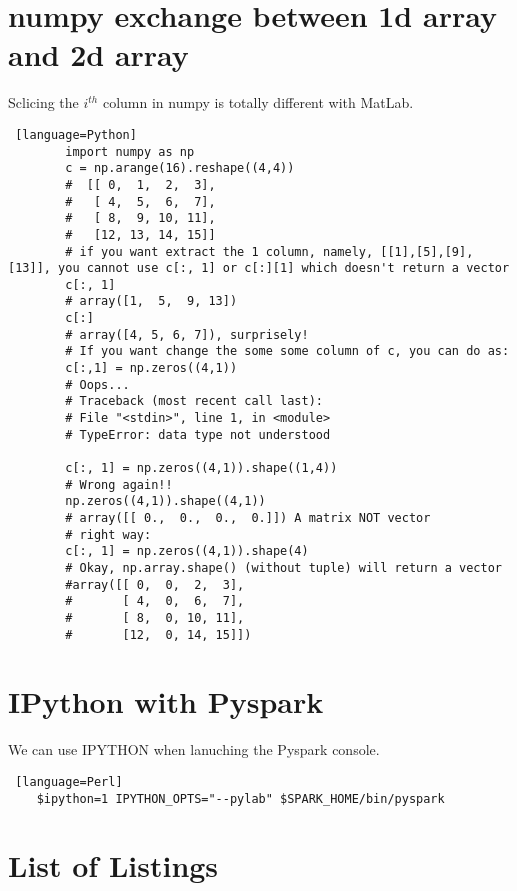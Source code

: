 \documentclass[a4paper, 12pt]{article}
\begin{document}
    \section{numpy exchange between 1d array and 2d array}
    Sclicing the $i^{th}$ column in numpy is totally different with MatLab.
    \begin{lstlisting} [language=Python]
        import numpy as np
        c = np.arange(16).reshape((4,4))
		#  [[ 0,  1,  2,  3],
	    #   [ 4,  5,  6,  7],
    	#   [ 8,  9, 10, 11],
      	#   [12, 13, 14, 15]]
		# if you want extract the 1 column, namely, [[1],[5],[9], [13]], you cannot use c[:, 1] or c[:][1] which doesn't return a vector
		c[:, 1]
		# array([1,  5,  9, 13])
		c[:]
		# array([4, 5, 6, 7]), surprisely!
		# If you want change the some some column of c, you can do as:
		c[:,1] = np.zeros((4,1))
		# Oops...
		# Traceback (most recent call last):
	  	# File "<stdin>", line 1, in <module>
		# TypeError: data type not understood
		
		c[:, 1] = np.zeros((4,1)).shape((1,4))
		# Wrong again!!
		np.zeros((4,1)).shape((4,1))
		# array([[ 0.,  0.,  0.,  0.]]) A matrix NOT vector
		# right way:
		c[:, 1] = np.zeros((4,1)).shape(4)
		# Okay, np.array.shape() (without tuple) will return a vector
		#array([[ 0,  0,  2,  3],
		#       [ 4,  0,  6,  7],
		#       [ 8,  0, 10, 11],
		#       [12,  0, 14, 15]])
    \end{lstlisting}
    \section{IPython with Pyspark}
    We can use IPYTHON when lanuching the Pyspark console.\\
    \begin{lstlisting} [language=Perl]
    $ipython=1 IPYTHON_OPTS="--pylab" $SPARK_HOME/bin/pyspark
    \end{lstlisting}


    
    



	\section*{List of Listings}
\end{document}
